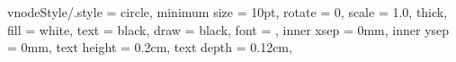 
\tikzset
{
vnodeStyle/.style =
{
circle,                                 %
minimum size    = 10pt,                %
rotate          = 0,                    %
scale           = 1.0,                  %
thick,                                  %
%
fill            = white,             %
text            = black,                %
draw            = black,                %
%
font            = \scriptsize,              %
inner xsep      = 0mm,                  %
inner ysep      = 0mm,                  %
text height     = 0.2cm,
text depth      = 0.12cm,
}
}






